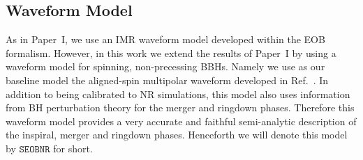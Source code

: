 \documentclass[twocolumn,prd,superscriptaddress,amsfonts,amssymb,amsmath,preprintnumbers]{revtex4-1}
\newcommand{\paperone}{Paper~I\xspace}
\newcommand{\SEOB}{\texttt{SEOBNR}}
\begin{document}
\subsection{Waveform Model}\label{sec:model}

As in \paperone, we use an IMR waveform model developed within the EOB formalism. However, in this work we extend the results of \paperone by using a waveform model for spinning, non-precessing BBHs. Namely we use as our baseline model the aligned-spin multipolar waveform developed in Ref.~\citep{Cotesta:2018fcv}. In addition to being calibrated to NR simulations, this model also uses information from BH perturbation theory for the merger and ringdown phases. Therefore this waveform model provides a very accurate and faithful semi-analytic description of the inspiral, merger and ringdown phases. Henceforth we will denote this model by $\SEOB$ for short.
\end{document}
